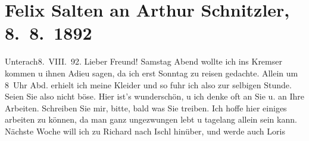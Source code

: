 

         
         \renewcommand{\erwaehntePersonen}{Personen: Hermann Bahr, Richard Beer-Hofmann, Marie Glümer, Hugo von Hofmannsthal, Paul Horn, Felix Salten, Gustav Schwarzkopf}
         \renewcommand{\erwaehnteOrte}{Orte: Bad Ischl, Berghof, Café Kremser, Deutschland, Unterach am Attersee, Wien}
         \renewcommand{\erwaehnteWerke}{}
               \section[Felix Salten an Arthur Schnitzler, 8. 8. 1892]{ Felix Salten an Arthur Schnitzler, 8. 8. 1892}\nopagebreak{}\rehead{ }\begin{ledgroupsized}[t]{13cm}\normalsize\beginnumbering{} \toendnotes[C]{\smallbreak\pagebreak[2]} 
\toendnotes[C]{\smallbreak}\pstart
           \raggedleft{}{\pb}Unterach8. VIII. 92.\pend
           \pstart
           Lieber Freund!{ }Samstag{ }Abend wollte ich ins Kremser kommen u
               ihnen Adieu sagen, da ich erst Sonntag zu reisen
               gedachte. Allein um 8 Uhr Abd. erhielt ich meine Kleider und so fuhr ich
               also zur selbigen Stunde. Seien Sie also nicht böse. Hier ist’s wunderschön, u ich
               denke oft an Sie u. an Ihre Arbeiten. Schreiben Sie mir, bitte, bald was Sie
               treiben.\pend
           \pstart
           {\pb}Ich hoffe hier einiges arbeiten zu können,
               da man ganz ungezwungen lebt u tagelang allein sein kann. Nächste Woche will ich zu
                  Richard nach Ischl hinüber, und werde auch Loris

\end{ledgroupsized}
